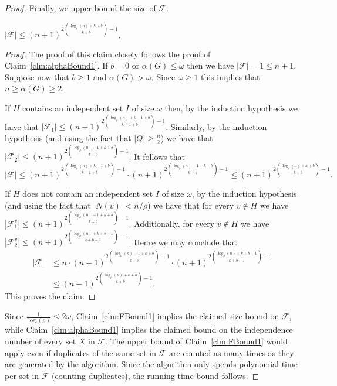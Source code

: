 \documentclass[10pt,a4paper]{amsart}
\newcommand{\cal}{\mathcal}
\begin{document}
\begin{proof}
Finally, we upper bound the size of ${\cal F}$.
\begin{claim}\label{clm:FBound1}
$|{\cal F}| \leq (n+1)^{ 2 {\overline{\log}_\rho(n) + k+b \choose k+b} - 1}$.
\end{claim}

\begin{proof}
The proof of this claim closely follows the proof of Claim~\ref{clm:alphaBound1}.
%
If $b=0$ or $\alpha(G) \leq \omega$ then we have $|{\cal F}| = 1 \leq n+1$. Suppose now that $b \geq 1$ and $\alpha(G) > \omega$. Since $\omega \geq 1$ this implies that $n \geq \alpha(G) \geq 2$. 

If $H$ contains an independent set $I$ of size $\omega$ then, by the induction hypothesis we have that $|{\cal F}_1| \leq (n+1)^{2 {\overline{\log}_\rho(n) + k-1+b \choose k-1+b} - 1}$.
%
Similarly, by the induction hypothesis (and using the fact that $|Q| \geq \frac{n}{2}$) we have that $|{\cal F}_2| \leq (n+1)^{2 {\overline{\log}_\rho(n)-1 + k+b \choose k+b} - 1}$.
%
It follows that
$$|{\cal F}| \leq 
(n+1)^{2 {\overline{\log}_\rho(n) + k-1+b \choose k-1+b} - 1} \cdot
(n+1)^{2 {\overline{\log}_\rho(n)-1 + k+b \choose k+b} - 1}
\leq
(n+1)^{ 2 {\overline{\log}_\rho(n) + k+b \choose k+b} - 1 }.
$$


If $H$ does not contain an independent set $I$ of size $\omega$, by the induction hypothesis (and using the fact that $|N(v)| < n/\rho$) we have that for every $v \notin H$ we have 
$|{\cal F}_1^v| \leq (n+1)^{2 {\overline{\log}_\rho(n) - 1 + k+b \choose k+b} - 1}$. Additionally, for every $v \notin H$ we have $|{\cal F}_2^v| \leq (n+1)^{2 {\overline{\log}_\rho(n) + k+b-1 \choose k+b-1} - 1}$. Hence we may conclude that  
\begin{align*}
|{\cal F}| & \leq 
n \cdot
(n+1)^{2 {\overline{\log}_\rho(n) - 1 + k+b \choose k+b} - 1} \cdot
(n+1)^{2 {\overline{\log}_\rho(n) + k+b-1 \choose k+b-1} - 1}\\
& \leq(n+1)^{ 2 {\overline{\log}_\rho(n) + k+b \choose k+b} - 1 } \mbox{.}
\end{align*}
%
This proves the claim.
\end{proof}

Since $\frac{1}{\log(\rho)} \leq 2\omega$, Claim~\ref{clm:FBound1} implies the claimed size bound on ${\cal F}$, while Claim~\ref{clm:alphaBound1} implies the claimed bound on the independence number of every set $X$ in ${\cal F}$. 
%
The upper bound of Claim~\ref{clm:FBound1} would apply even if duplicates of the same set in ${\cal F}$ are counted as many times as they are generated by the algorithm. Since the algorithm only spends polynomial time per set in ${\cal F}$ (counting duplicates), the running time bound follows.
\end{proof}
\end{document}
